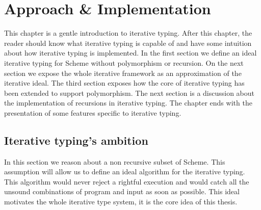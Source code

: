 \documentclass[a4paper]{report}
\begin{document}
\chapter{Approach \& Implementation\label{ch_approach}}

This chapter is a gentle introduction to iterative typing. After this chapter, the reader should know what iterative typing is capable of and have some intuition about how iterative typing is implemented. In the first section we define an ideal iterative typing for Scheme without polymorphism or recursion. On the next section we expose the whole iterative framework as an approximation of the iterative ideal. The third section exposes how the core of iterative typing has been extended to support polymorphism. The next section is a discussion about the implementation of recursions in iterative typing. The chapter ends with the presentation of some features specific to iterative typing.

\section{Iterative typing's ambition}

In this section we reason about a non recursive subset of Scheme. This assumption will allow us to define an ideal algorithm for the iterative typing. This algorithm would never reject a rightful execution and would catch all the unsound combinations of program and input as soon as possible. This ideal motivates the whole iterative type system, it is the core idea of this thesis.
\end{document}
